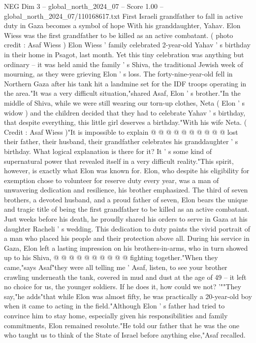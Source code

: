 \begin{textsample}{NEG Dim 3 – global\_north\_2024\_07 – Score 1.00 – global\_north\_2024\_07/110168617.txt}  \label{ex:f3_neg_370}
First Israeli grandfather to fall in active duty in Gaza becomes a symbol of hope With his granddaughter, Yahav.
Elon Wiess was the first grandfather to be killed as an active combatant. ( photo credit : Asaf Wiess ) Elon Wiess ' family celebrated 2-year-old Yahav ' s birthday in their home in Psagot, last month.
Yet this tiny celebration was anything but ordinary -- it was held amid the family ' s Shiva, the traditional Jewish week of mourning, as they were grieving Elon ' s loss.
The forty-nine-year-old fell in Northern Gaza after his tank hit a landmine set for the IDF troops operating in the area."It was a very difficult situation,"shared Asaf, Elon ' s brother."In the middle of Shiva, while we were still wearing our torn-up clothes, Neta ( Elon ' s widow ) and the children decided that they had to celebrate Yahav ' s birthday, that despite everything, this little girl deserves a birthday."With his wife Neta. ( Credit : Asaf Wiess )"It is impossible to explain @ @ @ @ @ @ @ @ @ @ lost their father, their husband, their grandfather celebrates his granddaughter ' s birthday.
What logical explanation is there for it?
It ' s some kind of supernatural power that revealed itself in a very difficult reality."This spirit, however, is exactly what Elon was known for.
Elon, who despite his eligibility for exemption chose to volunteer for reserve duty every year, was a man of unwavering dedication and resilience, his brother emphasized.
The third of seven brothers, a devoted husband, and a proud father of seven, Elon bears the unique and tragic title of being the first grandfather to be killed as an active combatant.
Just weeks before his death, he proudly shared his orders to serve in Gaza at his daughter Racheli ' s wedding.
This dedication to duty paints the vivid portrait of a man who placed his people and their protection above all.
During his service in Gaza, Elon left a lasting impression on his brothers-in-arms, who in turn showed up to his Shiva, @ @ @ @ @ @ @ @ @ @ fighting together."When they came,"says Asaf"they were all telling me ' Asaf, listen, to see your brother crawling underneath the tank, covered in mud and dust at the age of 49 -- it left no choice for us, the younger soldiers.
If he does it, how could we not? '""They say,"he adds"that while Elon was almost fifty, he was practically a 20-year-old boy when it came to acting in the field."Although Elon ' s father had tried to convince him to stay home, especially given his responsibilities and family commitments, Elon remained resolute."He told our father that he was the one who taught us to think of the State of Israel before anything else,"Asaf recalled.

\end{textsample}

